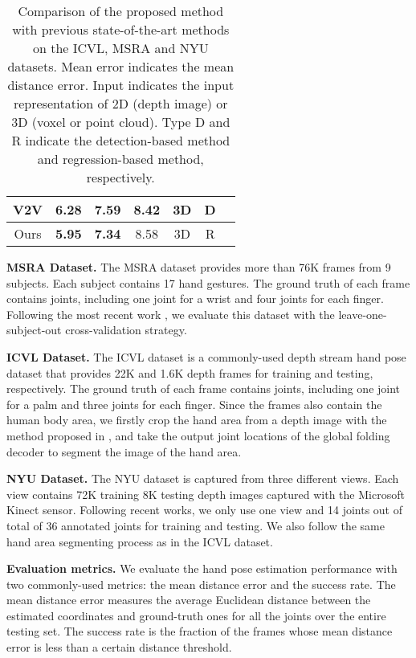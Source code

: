 \documentclass[10pt,twocolumn,letterpaper]{article}
\begin{document}
\begin{table}[h!]
\begin{center}
\begin{tabular}{ccccccc}
V2V \cite{moon2018v2v}               &6.28           &7.59          & 8.42           &3D   &D  \\
\hline
Ours                                 &\textbf{5.95}  &\textbf{7.34} & 8.58  &3D   &R\\
\hline
\end{tabular}
\end{center}
\caption{Comparison of the proposed method with previous state-of-the-art methods on the ICVL, MSRA and NYU datasets. Mean error indicates the mean distance error. Input indicates the input representation of 2D (depth image) or 3D (voxel or point cloud). Type D and R indicate the detection-based method and regression-based method, respectively.}
\label{tab:sota}
\end{table}



{\bf MSRA Dataset.} The MSRA dataset \cite{sun2015cascaded} provides more than 76K frames from 9 subjects. Each subject contains 17 hand gestures. The ground truth of each frame contains  joints, including one joint for a wrist and four joints for each finger. Following the most recent work \cite{sun2015cascaded}, we evaluate this dataset with the leave-one-subject-out cross-validation strategy.


{\bf ICVL Dataset.} The ICVL dataset \cite{tang2014latent} is a commonly-used depth stream hand pose dataset that provides 22K and 1.6K depth frames for training and testing, respectively. The ground truth of each frame contains  joints, including one joint for a palm and three joints for each finger. Since the frames also contain the human body area, we firstly crop the hand area from a depth image with the method proposed in \cite{oberweger2017deepprior++}, and take the output joint locations of the global folding decoder to segment the image of the hand area.


{\bf NYU Dataset.} The NYU dataset is captured from three different views. Each view contains 72K training 8K testing depth images captured with the Microsoft Kinect sensor. Following recent works, we only use one view and 14 joints out of total of 36 annotated joints for training and testing.
We also follow the same hand area segmenting process as in the ICVL dataset.




{\bf Evaluation metrics.}
We evaluate the hand pose estimation performance with two commonly-used metrics: the mean distance error and the success rate. The mean distance error measures the average Euclidean distance between the estimated coordinates and ground-truth ones for all the joints over the entire testing set. The success rate is the fraction of the frames whose mean distance error is less than a certain distance threshold.
\end{document}
